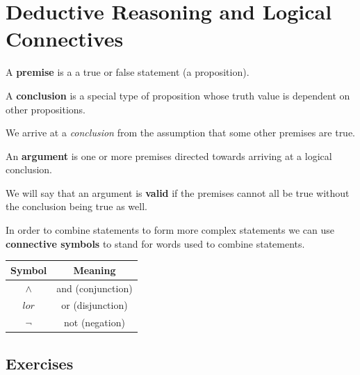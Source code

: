 \section{Deductive Reasoning and Logical Connectives}

\begin{definition}[Premises]
    A \textbf{premise} is a a true or false statement (a proposition).
\end{definition}

\begin{definition}[Conclusions]
    A \textbf{conclusion} is a special type of proposition whose truth value is dependent on other propositions.
\end{definition}

We arrive at a \textit{conclusion} from the assumption that some other premises are true.

\begin{definition}[Arguments]
    An \textbf{argument} is one or more premises directed towards arriving at a logical conclusion.
\end{definition}

We will say that an argument is \textbf{valid} if the premises cannot all be true without the conclusion being true as well.

In order to combine statements to form more complex statements we can use \textbf{connective symbols} to stand for words used to combine statements.

\begin{table}[H]
    \centering
    \begin{tabular}{c | c}
        Symbol  & Meaning           \\
        \hline
        $\land$ & and (conjunction) \\
        $lor$   & or (disjunction)  \\
        $\lnot$ & not (negation)
    \end{tabular}
\end{table}

\subsection{Exercises}

